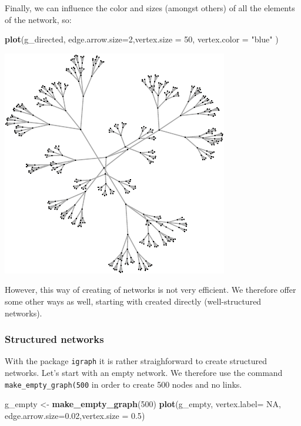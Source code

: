 \documentclass[]{article}
\newenvironment{Shaded}{\begin{snugshade}}{\end{snugshade}}
\newcommand{\KeywordTok}[1]{\textcolor[rgb]{0.13,0.29,0.53}{\textbf{{#1}}}}
\newcommand{\DataTypeTok}[1]{\textcolor[rgb]{0.13,0.29,0.53}{{#1}}}
\newcommand{\DecValTok}[1]{\textcolor[rgb]{0.00,0.00,0.81}{{#1}}}
\newcommand{\FloatTok}[1]{\textcolor[rgb]{0.00,0.00,0.81}{{#1}}}
\newcommand{\StringTok}[1]{\textcolor[rgb]{0.31,0.60,0.02}{{#1}}}
\newcommand{\OtherTok}[1]{\textcolor[rgb]{0.56,0.35,0.01}{{#1}}}
\newcommand{\NormalTok}[1]{{#1}}
\begin{document}
Finally, we can influence the color and sizes (amongst others) of all
the elements of the network, so:

\begin{Shaded}
\begin{Highlighting}[]
\KeywordTok{plot}\NormalTok{(g_directed, }\DataTypeTok{edge.arrow.size=}\DecValTok{2}\NormalTok{,}\DataTypeTok{vertex.size =} \DecValTok{50}\NormalTok{, }\DataTypeTok{vertex.color =} \StringTok{"blue"} \NormalTok{)}
\end{Highlighting}
\end{Shaded}

\includegraphics{ResearchTools_files/figure-latex/unnamed-chunk-45-1.pdf}

However, this way of creating of networks is not very efficient. We
therefore offer some other ways as well, starting with created directly
(well-structured networks).

\subsubsection{Structured networks}\label{structured-networks}

With the package \texttt{igraph} it is rather straighforward to create
structured networks. Let's start with an empty network. We therefore use
the command \texttt{make\_empty\_graph(500} in order to create 500 nodes
and no links.

\begin{Shaded}
\begin{Highlighting}[]
\NormalTok{g_empty <-}\StringTok{ }\KeywordTok{make_empty_graph}\NormalTok{(}\DecValTok{500}\NormalTok{)}
\KeywordTok{plot}\NormalTok{(g_empty, }\DataTypeTok{vertex.label=} \OtherTok{NA}\NormalTok{, }\DataTypeTok{edge.arrow.size=}\FloatTok{0.02}\NormalTok{,}\DataTypeTok{vertex.size =} \FloatTok{0.5}\NormalTok{)}
\end{Highlighting}
\end{Shaded}
\end{document}
